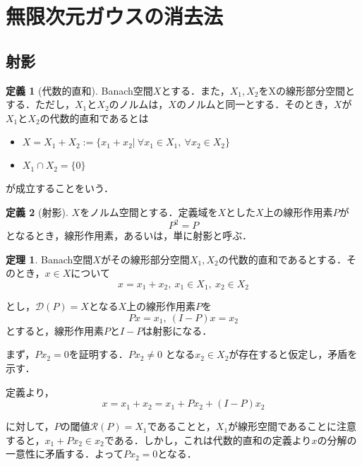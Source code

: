 \documentclass[11pt,a4paper]{jsarticle}
\theoremstyle{definition}
\newtheorem{dfn}{定義}
\newtheorem{thm}{定理}
\begin{document}
%

\section{無限次元ガウスの消去法}
\subsection{射影}

\begin{dfn}[代数的直和]
  Banach空間$X$とする．また，$X_1,X_2$をXの線形部分空間とする．ただし，$X_1$と$X_2$のノルムは，$X$のノルムと同一とする．そのとき，$X$が$X_1$と$X_2$の代数的直和であるとは
  \begin{itemize}
    \item $X=X_1+X_2:=\{x_1+x_2 | \  \forall x_1 \in X_1, \ \forall x_2 \in X_2 \}$
    \item $X_1 \cap X_2 = \{0\}$
  \end{itemize}
  が成立することをいう．
\end{dfn}

\begin{dfn}[射影]
  $X$をノルム空間とする．定義域を$X$とした$X$上の線形作用素$P$が
  \begin{equation*}
    P^2=P
  \end{equation*}
  となるとき，線形作用素，あるいは，単に射影と呼ぶ．
\end{dfn}

\begin{thm}
  Banach空間$X$がその線形部分空間$X_1,X_2$の代数的直和であるとする．そのとき，$x\in X$について
  \begin{equation*}
    x=x_1+x_2,\ x_1 \in X_1,\ x_2 \in X_2
  \end{equation*}
\end{thm}
とし，$\mathcal{D}(P)=X$となる$X$上の線形作用素$P$を
\begin{equation*}
  Px=x_1,\ (I-P)x=x_2
\end{equation*}
とすると，線形作用素$P$と$I-P$は射影になる．

\proof{}
まず，$P{x_2}=0$を証明する．$P{x_2} \neq 0$ となる$x_2 \in X_2$が存在すると仮定し，矛盾を示す．

定義より，
\begin{equation*}
  x = x_1 + x_2 = x_1 + P{x_2} + (I-P)x_2
\end{equation*}

に対して，$P$の閾値$\mathcal{R}(P)=X_1$であることと，$X_1$が線形空間であることに注意すると，$x_1+Px_2 \in x_2 $である．しかし，これは代数的直和の定義より$x$の分解の一意性に矛盾する．よって$P{x_2}=0$となる．
\end{document}
